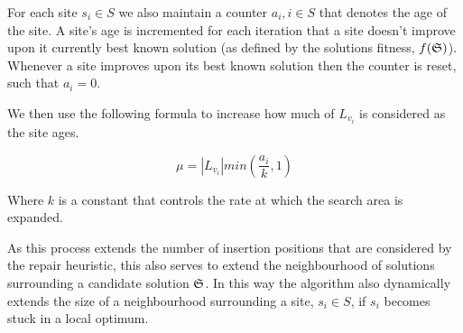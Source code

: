 For each site $s_i \in S$ we also maintain a counter $a_i, i \in S$ that denotes the age of the site. A site's age is incremented for each iteration that a site doesn't improve upon it currently best known solution (as defined by the solutions fitness, $f(\mathfrak{S})$). Whenever a site improves upon its best known solution then the counter is reset, such that $a_i = 0$.


We then use the following formula to increase how much of $L_{v_i}$ is considered as the site ages.

\[
   \mu = \left|L_{v_i}\right| min\left(\frac{a_i}{k}, 1\right)
\]

Where $k$ is a constant that controls the rate at which the search area is expanded. 

As this process extends the number of insertion positions that are considered by the repair heuristic, this also serves to extend the neighbourhood of solutions surrounding a candidate solution $\mathfrak{S}$. In this way the algorithm also dynamically extends the size of a neighbourhood surrounding a site, $s_i \in S$, if $s_i$ becomes stuck in a local optimum.


